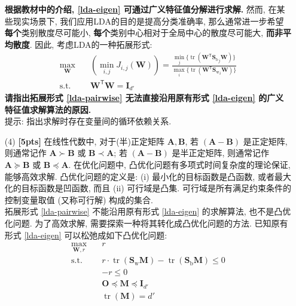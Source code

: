 \documentclass[a4paper]{article}
\numberwithin{equation}{section}
\theoremstyle{definition}
\def \transposed {\mathsf{T}}
\def \Sw {\mathbf{S}_{\operatorname{w}}}
\def \Sb {\mathbf{S}_{\operatorname{b}}}
\def \A {\mathbf{A}}
\def \B {\mathbf{B}}
\def \O {\mathbf{O}}
\def \I {\mathbf{I}}
\def \M {\mathbf{M}}
\def \W {\mathbf{W}}
\newcommand\sbr[1]{\left( #1 \right)}
\newcommand\tr[1]{\operatorname{tr}\sbr{#1}}
\begin{document}
\begin{enumerate}
          \textbf{根据教材中的介绍, \eqref{lda-eigen} 可通过广义特征值分解进行求解.} 然而, 在某些现实场景下, 我们应用LDA的目的是提高分类准确率, 那么通常进一步希望\textbf{每个}类别散度尽可能小, \textbf{每个}类别中心相对于全局中心的散度尽可能大, \textbf{而非平均散度}. 因此, 考虑LDA的一种拓展形式:
          \begin{equation}
              \begin{aligned}
                  \max_{\W} \quad     & \sbr{\min_{i,j} J_{i,j}(\W)} = \frac{\min_{j} \{ \tr{\W^\transposed {\Sb}_j \W} \}}{\max_{i} \{ \tr{\W^\transposed {\Sw}_i \W} \}} \\
                  \mathrm{s.t.} \quad & \W^\transposed \W = \I_{d'}
              \end{aligned}
              \label{lda-pairwise}
          \end{equation}
          \textbf{请指出拓展形式 \eqref{lda-pairwise} 无法直接沿用原有形式 \eqref{lda-eigen} 的广义特征值求解算法的原因.} \\
          提示: 指出求解时存在变量间的循环依赖关系.
    \item[(4)] \textbf{[5pts]} \textsf{在线性代数中, 对于(半)正定矩阵 $\A, \B$, 若 $\sbr{\A-\B}$ 是正定矩阵, 则通常记作 $\A \succ \B$ 或 $\B \prec \A$; 若 $\sbr{\A-\B}$ 是半正定矩阵, 则通常记作 $\A \succcurlyeq \B$ 或 $\B \preccurlyeq \A$. 在优化问题中, 凸优化问题有多项式时间复杂度的理论保证, 能够高效求解. 凸优化问题的定义是: (i) 最小化的目标函数是凸函数, 或者最大化的目标函数是凹函数, 而且 (ii) 可行域是凸集. 可行域是所有满足约束条件的控制变量取值 (又称可行解) 构成的集合.} \\
          拓展形式 \eqref{lda-pairwise} 不能沿用原有形式 \eqref{lda-eigen} 的求解算法, 也不是凸优化问题. 为了高效求解, 需要探索一种将其转化成凸优化问题的方法. 已知原有形式 \eqref{lda-eigen} 可以松弛成如下凸优化问题:
          \begin{equation}
              \begin{aligned}
                  \max_{\W,r} \quad   & r                                             \\
                  \mathrm{s.t.} \quad & r \cdot \tr{\Sw \M} - \tr{\Sb \M} \leqslant 0 \\
                  \quad               & -r \leqslant 0                                \\
                  \quad               & \O \preccurlyeq \M \preccurlyeq \I_{d'}       \\
                  \quad               & \tr{\M} = d'                                  \\

\end{aligned}
\end{equation}
\end{enumerate}
\end{document}
